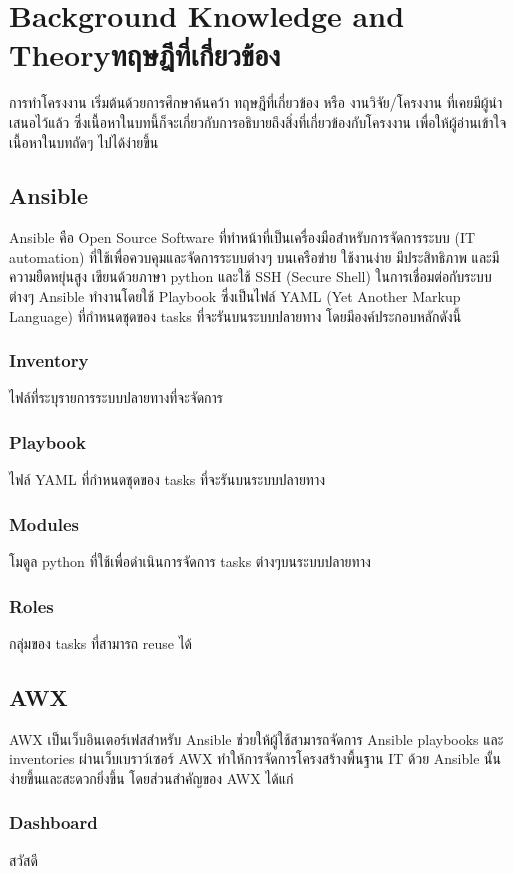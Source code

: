 \chapter{\ifenglish Background Knowledge and Theory\else ทฤษฎีที่เกี่ยวข้อง\fi}

การทำโครงงาน เริ่มต้นด้วยการศึกษาค้นคว้า ทฤษฎีที่เกี่ยวข้อง หรือ งานวิจัย/โครงงาน ที่เคยมีผู้นำเสนอไว้แล้ว ซึ่งเนื้อหาในบทนี้ก็จะเกี่ยวกับการอธิบายถึงสิ่งที่เกี่ยวข้องกับโครงงาน เพื่อให้ผู้อ่านเข้าใจเนื้อหาในบทถัดๆ ไปได้ง่ายขึ้น

\section{Ansible}
Ansible คือ Open Source Software ที่ทำหน้าที่เป็นเครื่องมือสำหรับการจัดการระบบ (IT automation) ที่ใช้เพื่อควบคุมและจัดการระบบต่างๆ บนเครือข่าย ใช้งานง่าย มีประสิทธิภาพ และมีความยืดหยุ่นสูง เขียนด้วยภาษา python และใช้ SSH (Secure Shell) ในการเชื่อมต่อกับระบบต่างๆ Ansible ทำงานโดยใช้ Playbook ซึ่งเป็นไฟล์ YAML (Yet Another Markup Language) ที่กำหนดชุดของ tasks ที่จะรันบนระบบปลายทาง โดยมีองค์ประกอบหลักดังนี้
\subsection{Inventory}
ไฟล์ที่ระบุรายการระบบปลายทางที่จะจัดการ
\subsection{Playbook}
ไฟล์ YAML ที่กำหนดชุดของ tasks ที่จะรันบนระบบปลายทาง
\subsection{Modules}
โมดูล python ที่ใช้เพื่อดำเนินการจัดการ tasks ต่างๆบนระบบปลายทาง
\subsection{Roles}
กลุ่มของ tasks ที่สามารถ reuse ได้

\section{AWX}
AWX เป็นเว็บอินเตอร์เฟสสำหรับ Ansible ช่วยให้ผู้ใช้สามารถจัดการ Ansible playbooks และ inventories ผ่านเว็บเบราว์เซอร์ AWX ทำให้การจัดการโครงสร้างพื้นฐาน IT ด้วย Ansible นั้นง่ายขึ้นและสะดวกยิ่งขึ้น โดยส่วนสำคัญของ AWX ได้แก่
\subsection{Dashboard}
สวัสดี

